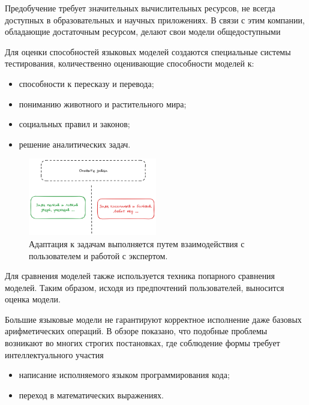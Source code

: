 Предобучение требует значительных вычислительных ресурсов, не всегда доступных в образовательных и научных
приложениях. В связи с этим компании, обладающие достаточным ресурсом, делают свои модели общедоступными \cite{jiang2023mistral} \cite{jiang2024mixtral} \cite{touvron2023llama}

Для оценки способностей языковых моделей создаются специальные системы тестирования, количественно оценивающие способности моделей к:
\begin{itemize}
    \item способности к пересказу и перевода;
    \item пониманию животного и растительного мира;
    \item социальных правил и законов;
    \item решение аналитических задач.
\end{itemize}

\begin{figure}[h]
    \centering
    \includegraphics[width=0.5\textwidth]{assets/work/arch/instruction.excalidraw.png}
    \caption{Адаптация к задачам выполняется путем взаимодействия с пользователем и работой с экспертом.}
    \label{instruction}
\end{figure}

Для сравнения моделей также используется техника попарного сравнения моделей. Таким образом, исходя из предпочтений пользователей, 
выносится оценка модели.

Большие языковые модели не гарантируют корректное исполнение даже базовых арифметических операций. В обзоре \cite{zhao2023survey} показано, 
что подобные проблемы возникают во многих строгих постановках, где соблюдение формы требует интеллектуального участия 
\begin{itemize}
    \item написание исполняемого языком программирования кода;
    \item переход в математических выражениях.
\end{itemize} 

